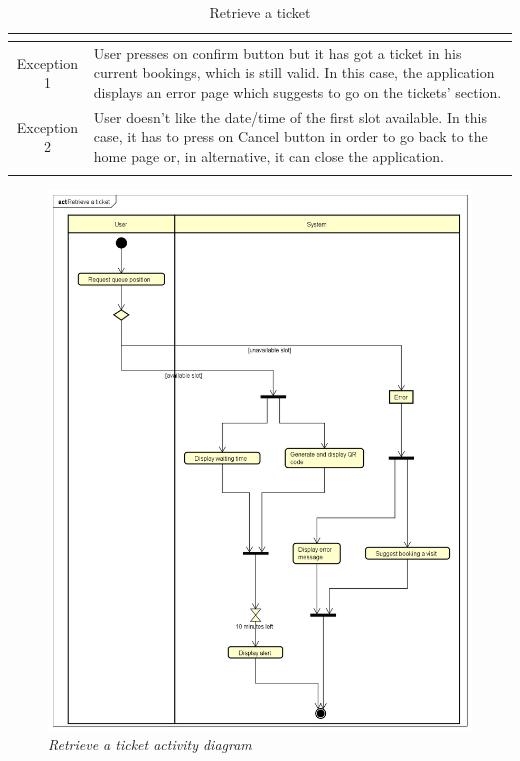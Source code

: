 \documentclass[table, 12pt]{article}
\begin{document}
\begin{longtable}{|c| p{10cm}|}
\begin{itemize}
    \end{itemize}                                                                                                                                                                               \\
    \hline
    \hline
    Exception 1      & User presses on confirm button but it has got a ticket in his current bookings, which is still valid. In this case, the application displays an error page which suggests to go on the tickets' section. \\
    \hline
    Exception 2      & User doesn't like the date/time of the first slot available. In this case, it has to press on Cancel button in order to go back to the home page or, in alternative, it can close the application.       \\
    \hline
    \caption{Retrieve a ticket}                                                                                                                                                                                                 \\
\end{longtable}

\begin{figure}[H]
    \centering
    \includegraphics[scale=0.4]{assets/Activity-Diagrams/act_retrieve.png}
    \caption{\textit{Retrieve a ticket activity diagram}}
\end{figure}
\end{document}
